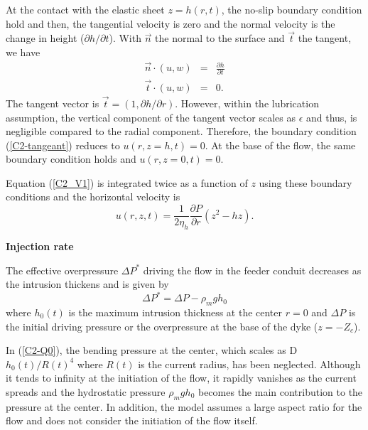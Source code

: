 At the contact with the elastic sheet $z=h(r,t)$, the no-slip boundary
condition  hold and  then, the  tangential  velocity is  zero and  the
normal velocity  is the change  in height ($\partial h/  \partial t$).
With $\vec{n}$ the normal to the surface and $\vec{t}$ the tangent, we
have
\begin{eqnarray}
  \vec{n} \cdot (u,w) &=& \frac{\partial h }{\partial t}\\
  \vec{t} \cdot (u,w) &=& 0 \label{C2-tangeant}.
\end{eqnarray}
The  tangent  vector is  $\vec{t}  =  (1,  \partial h/  \partial  r)$.
However, within the lubrication  assumption, the vertical component of
the  tangent  vector scales  as  $\epsilon$  and thus,  is  negligible
compared to  the radial  component. Therefore, the  boundary condition
(\ref{C2-tangeant}) reduces  to $u(r,z=h,t) =0$.   At the base  of the
flow, the same boundary condition holds and $u(r,z=0,t) =0$.

Equation (\ref{C2_V1}) is integrated twice  as a function of $z$ using
these boundary conditions and the horizontal velocity is
\begin{equation}
  u(r,z,t) =\frac{1}{2\eta_h} \frac{\partial P}{\partial r} \left(z^2-hz\right).
  \label{C2-vel}
\end{equation}

\vspace{.5cm} \textbf{Injection rate} \vspace{.5cm}

The effective overpressure $\Delta P^*$ driving the flow in the feeder
conduit decreases as the intrusion thickens and is given by
\begin{equation}
  \Delta P^* = \Delta P -\rho_m g h_0 \label{C2-Q0}
\end{equation}
where $h_0(t)$ is the maximum  intrusion thickness at the center $r=0$
and $\Delta P$ is the initial  driving pressure or the overpressure at
the base of the dyke ($z = -Z_c$).

In (\ref{C2-Q0}), the bending pressure  at the center, which scales as
D$h_0(t)/R(t)^4$  where  $R(t)$  is   the  current  radius,  has  been
neglected.  Although  it tends  to infinity at  the initiation  of the
flow, it rapidly  vanishes as the current spreads  and the hydrostatic
pressure $\rho_m g h_0$ becomes  the main contribution to the pressure
at the  center.  In addition, the  model assumes a large  aspect ratio
for the flow and does not consider the initiation of the flow itself.

